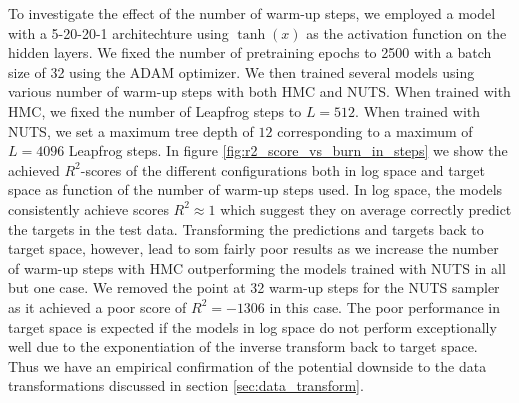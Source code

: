 To investigate the effect of the number of warm-up steps, we employed a model with a 5-20-20-1 architechture using $\tanh(x)$ as the activation function on the hidden layers. We fixed the number of pretraining epochs to 2500 with a batch size of 32 using the ADAM optimizer.
We then trained several models using various number of warm-up steps with both HMC and NUTS. When trained with HMC, we fixed the number of Leapfrog steps to $L = 512$. When trained with NUTS, we set a maximum tree depth of $12$ corresponding to a maximum of $L = 4096$ Leapfrog steps.
In figure \ref{fig:r2_score_vs_burn_in_steps} we show the achieved $R^2$-scores of the different configurations both in log space and target space as function of the number of warm-up steps used. In log space, the models consistently achieve scores $R^2 \approx 1$ which suggest they on average correctly predict the targets in the test data. Transforming the predictions and targets back to target space, however, lead to som fairly poor results as we increase the number of warm-up steps with HMC outperforming the models trained with NUTS in all but one case. We removed the point at 32 warm-up steps for the NUTS sampler as it achieved a poor score of $R^2 = -1306$ in this case. 
The poor performance in target space is expected if the models in log space do not perform exceptionally well due to the exponentiation of the inverse transform back to target space. Thus we have an empirical confirmation of the potential downside to the data transformations discussed in section \ref{sec:data_transform}.

